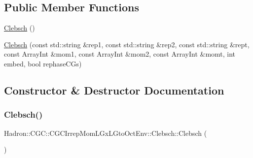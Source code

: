 \subsection*{Public Member Functions}
\begin{DoxyCompactItemize}
\item 
\mbox{\hyperlink{classHadron_1_1CGC_1_1CGCIrrepMomLGxLGtoOctEnv_1_1Clebsch_a3d2708b7f0e34831c30e5c1e6d401c5b}{Clebsch}} ()
\item 
\mbox{\hyperlink{classHadron_1_1CGC_1_1CGCIrrepMomLGxLGtoOctEnv_1_1Clebsch_ad45db603e49894fc27cb00dd494fb286}{Clebsch}} (const std\+::string \&rep1, const std\+::string \&rep2, const std\+::string \&rept, const Array\+Int \&mom1, const Array\+Int \&mom2, const Array\+Int \&momt, int embed, bool rephase\+C\+Gs)
\end{DoxyCompactItemize}


\subsection{Constructor \& Destructor Documentation}
\mbox{\label{classHadron_1_1CGC_1_1CGCIrrepMomLGxLGtoOctEnv_1_1Clebsch_a3d2708b7f0e34831c30e5c1e6d401c5b}} 
\subsubsection{\texorpdfstring{Clebsch()}{Clebsch()}\hspace{0.1cm}{\footnotesize\ttfamily [1/2]}}
{\footnotesize\ttfamily Hadron\+::\+C\+G\+C\+::\+C\+G\+C\+Irrep\+Mom\+L\+Gx\+L\+Gto\+Oct\+Env\+::\+Clebsch\+::\+Clebsch (\begin{DoxyParamCaption}{ }\end{DoxyParamCaption})\hspace{0.3cm}{\ttfamily [inline]}}

\mbox{\label{classHadron_1_1CGC_1_1CGCIrrepMomLGxLGtoOctEnv_1_1Clebsch_ad45db603e49894fc27cb00dd494fb286}} 
